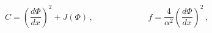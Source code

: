 \begin{equation}
C=\left( \frac{d\Phi }{dx}\right) ^{2}+J\left( \Phi \right) \,,\ \ \ \ \ \ \
\ \ \ \ \ \ \ \ \ \ \ \ \ \ \ \ \ \ \ \ \ \ f=\frac{4}{\alpha ^{2}}\left( 
\frac{d\Phi }{dx}\right) ^{2}\,,  \label{sol2}
\end{equation}

